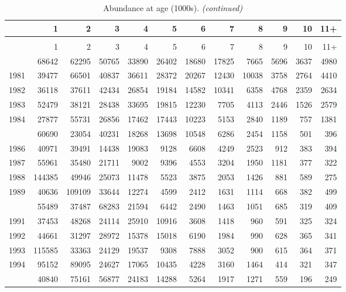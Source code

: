 \documentclass[
]{article}
\begin{document}
\begin{longtable}[t]{lrrrrrrrrrrr}
\caption{\label{tab:NAA-table}Abundance at age (1000s).}\\
\toprule
  & 1 & 2 & 3 & 4 & 5 & 6 & 7 & 8 & 9 & 10 & 11+\\
\midrule
\endfirsthead
\caption[]{Abundance at age (1000s). \textit{(continued)}}\\
\toprule
  & 1 & 2 & 3 & 4 & 5 & 6 & 7 & 8 & 9 & 10 & 11+\\
\midrule
\endhead

\endfoot
\bottomrule
\endlastfoot
1980 & 68642 & 62295 & 50765 & 33890 & 26402 & 18680 & 17825 & 7665 & 5696 & 3637 & 4980\\
1981 & 39477 & 66501 & 40837 & 36611 & 28372 & 20267 & 12430 & 10038 & 3758 & 2764 & 4410\\
1982 & 36118 & 37611 & 42434 & 26854 & 19184 & 14582 & 10341 & 6358 & 4768 & 2359 & 2634\\
1983 & 52479 & 38121 & 28438 & 33695 & 19815 & 12230 & 7705 & 4113 & 2446 & 1526 & 2579\\
1984 & 27877 & 55731 & 26856 & 17462 & 17443 & 10223 & 5153 & 2840 & 1189 & 757 & 1381\\
\addlinespace
1985 & 60690 & 23054 & 40231 & 18268 & 13698 & 10548 & 6286 & 2454 & 1158 & 501 & 396\\
1986 & 40971 & 39491 & 14438 & 19083 & 9128 & 6608 & 4249 & 2523 & 912 & 383 & 394\\
1987 & 55961 & 35480 & 21711 & 9002 & 9396 & 4553 & 3204 & 1950 & 1181 & 377 & 322\\
1988 & 144385 & 49946 & 25073 & 11478 & 5523 & 3875 & 2053 & 1426 & 881 & 589 & 275\\
1989 & 40636 & 109109 & 33644 & 12274 & 4599 & 2412 & 1631 & 1114 & 668 & 382 & 499\\
\addlinespace
1990 & 55489 & 37487 & 68283 & 21594 & 6442 & 2490 & 1463 & 1051 & 685 & 319 & 409\\
1991 & 37453 & 48268 & 24114 & 25910 & 10916 & 3608 & 1418 & 960 & 591 & 325 & 324\\
1992 & 44661 & 31297 & 28972 & 15378 & 15018 & 6190 & 1984 & 990 & 628 & 365 & 341\\
1993 & 115585 & 33363 & 24129 & 19537 & 9308 & 7888 & 3052 & 900 & 615 & 364 & 371\\
1994 & 95152 & 89095 & 24627 & 17065 & 10435 & 4228 & 3160 & 1464 & 414 & 321 & 347\\
\addlinespace
1995 & 40840 & 75161 & 56877 & 24183 & 14288 & 5264 & 1917 & 1271 & 559 & 196 & 249\\

\end{longtable}
\end{document}
